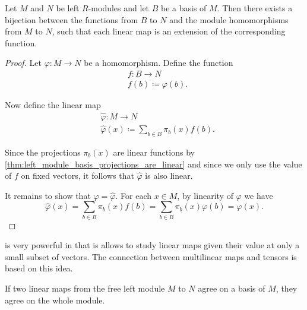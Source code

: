 \begin{theorem}\label{thm:linear_map_iff_function_on_basis}
  Let \( M \) and \( N \) be left \( R \)-modules and let \( B \) be a basis of \( M \). Then there exists a bijection between the functions from \( B \) to \( N \) and the module homomorphisms from \( M \) to \( N \), such that each linear map is an extension of the corresponding function.
\end{theorem}
\begin{proof}
  Let \( \varphi: M \to N \) be a homomorphism. Define the function
  \begin{align*}
    &f: B \to N \\
    &f(b) \coloneqq \varphi(b).
  \end{align*}

  Now define the linear map
  \begin{align*}
    &\hat \varphi: M \to N \\
    &\hat \varphi(x) \coloneqq \sum_{b \in B} \pi_b(x) f(b).
  \end{align*}

  Since the projections \( \pi_b(x) \) are linear functions by \cref{thm:left_module_basis_projections_are_linear} and since we only use the value of \( f \) on fixed vectors, it follows that \( \hat \varphi \) is also linear.

  It remains to show that \( \varphi = \hat \varphi \). For each \( x \in M \), by linearity of \( \varphi \) we have
  \begin{equation*}
    \hat \varphi(x)
    =
    \sum_{b \in B} \pi_b(x) f(b)
    =
    \sum_{b \in B} \pi_b(x) \varphi(b)
    =
    \varphi(x).
  \end{equation*}
\end{proof}

\begin{remark}\label{remark:linear_map_iff_function_on_basis}
   is very powerful in that is allows to study linear maps given their value at only a small subset of vectors. The connection between multilinear maps and tensors is based on this idea.
\end{remark}

\begin{corollary}\label{thm:linear_maps_agree_on_free_module_if_they_agree_on_basis}
  If two linear maps from the free left module \( M \) to \( N \) agree on a basis of \( M \), they agree on the whole module.
\end{corollary}

